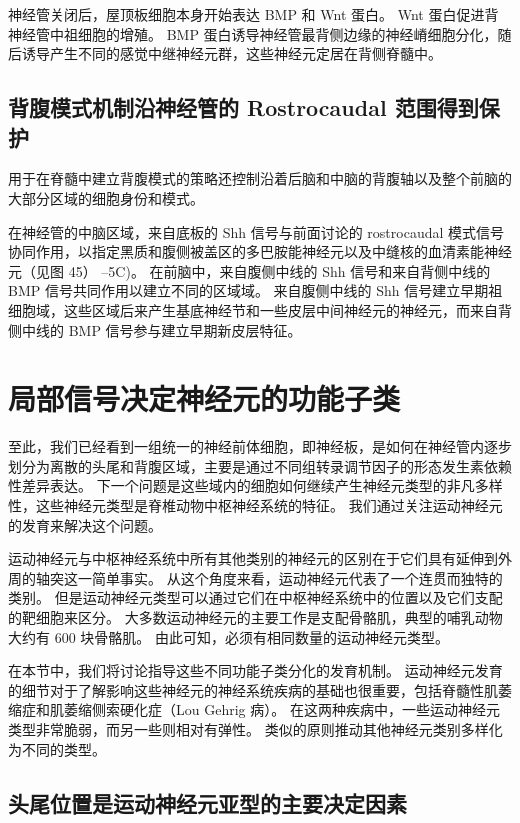 神经管关闭后，屋顶板细胞本身开始表达 BMP 和 Wnt 蛋白。
Wnt 蛋白促进背神经管中祖细胞的增殖。
BMP 蛋白诱导神经管最背侧边缘的神经嵴细胞分化，随后诱导产生不同的感觉中继神经元群，这些神经元定居在背侧脊髓中。



\subsection{背腹模式机制沿神经管的 Rostrocaudal 范围得到保护}

用于在脊髓中建立背腹模式的策略还控制沿着后脑和中脑的背腹轴以及整个前脑的大部分区域的细胞身份和模式。


在神经管的中脑区域，来自底板的 Shh 信号与前面讨论的 rostrocaudal 模式信号协同作用，以指定黑质和腹侧被盖区的多巴胺能神经元以及中缝核的血清素能神经元（见图 45） –5C)。
在前脑中，来自腹侧中线的 Shh 信号和来自背侧中线的 BMP 信号共同作用以建立不同的区域域。
来自腹侧中线的 Shh 信号建立早期祖细胞域，这些区域后来产生基底神经节和一些皮层中间神经元的神经元，而来自背侧中线的 BMP 信号参与建立早期新皮层特征。



\section{局部信号决定神经元的功能子类}

至此，我们已经看到一组统一的神经前体细胞，即神经板，是如何在神经管内逐步划分为离散的头尾和背腹区域，主要是通过不同组转录调节因子的形态发生素依赖性差异表达。
下一个问题是这些域内的细胞如何继续产生神经元类型的非凡多样性，这些神经元类型是脊椎动物中枢神经系统的特征。
我们通过关注运动神经元的发育来解决这个问题。


运动神经元与中枢神经系统中所有其他类别的神经元的区别在于它们具有延伸到外周的轴突这一简单事实。
从这个角度来看，运动神经元代表了一个连贯而独特的类别。
但是运动神经元类型可以通过它们在中枢神经系统中的位置以及它们支配的靶细胞来区分。
大多数运动神经元的主要工作是支配骨骼肌，典型的哺乳动物大约有 600 块骨骼肌。
由此可知，必须有相同数量的运动神经元类型。


在本节中，我们将讨论指导这些不同功能子类分化的发育机制。
运动神经元发育的细节对于了解影响这些神经元的神经系统疾病的基础也很重要，包括脊髓性肌萎缩症和肌萎缩侧索硬化症（Lou Gehrig 病）。
在这两种疾病中，一些运动神经元类型非常脆弱，而另一些则相对有弹性。
类似的原则推动其他神经元类别多样化为不同的类型。



\subsection{头尾位置是运动神经元亚型的主要决定因素}

